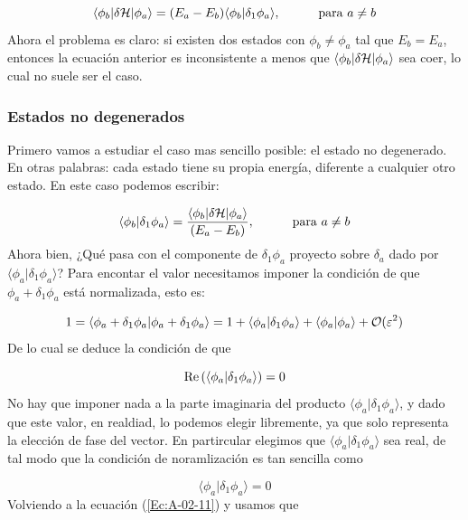 \begin{equation}
    \langle \phi_b |\delta \mathcal{H} |\phi_a \rangle = (E_a - E_b) \langle \phi_b |\delta_1 \phi_a \rangle, \quad \quad \quad \text{para}  \ a \neq b
\end{equation}
Ahora el problema es claro: si existen dos estados con $\phi_b \neq \phi_a$ tal que $E_b = E_a$, entonces la ecuación anterior es inconsistente a menos que $\langle \phi_b | \delta \mathcal{H} |\phi_a\rangle$ sea coer, lo cual no suele ser el caso.

\subsubsection{Estados no degenerados}

Primero vamos a estudiar el caso mas sencillo posible: el estado no degenerado. En otras palabras: cada estado tiene su propia energía, diferente a cualquier otro estado. En este caso podemos escribir:

\begin{equation}
    \langle \phi_b |\delta_1 \phi_a \rangle = \frac{\langle \phi_b |\delta \mathcal{H} |\phi_a \rangle}{(E_a - E_b)}, \quad \quad \quad \text{para}  \ a \neq b \label{Ec:A-02-11}
\end{equation}
Ahora bien, ¿Qué pasa con el componente de $\delta_1 \phi_a$ proyecto sobre $\delta_a$ dado por $\langle \phi_a |\delta_1 \phi_a \rangle$? Para encontar el valor necesitamos imponer la condición de que $\phi_a + \delta_1 \phi_a$ está normalizada, esto es:

\begin{equation}
    1 = \langle \phi_a + \delta_1 \phi_a | \phi_a + \delta_1 \phi_a \rangle = 1+ \langle \phi_a |\delta_1 \phi_a \rangle + \langle \phi_a | \phi_a \rangle + \mathcal{O} (\varepsilon^2)
\end{equation}
De lo cual se deduce la condición de que 

\begin{equation}
     \text{Re} \left( \langle \phi_a |\delta_1 \phi_a \rangle  \right)=0
\end{equation}
No hay que imponer nada a la parte imaginaria del producto $\langle \phi_a | \delta_1 \phi_a \rangle $, y dado que este valor, en realdiad, lo podemos elegir libremente, ya que solo representa la elección de fase del vector. En partircular elegimos que $\langle \phi_a | \delta_1 \phi_a \rangle $ sea real, de tal modo que la condición de noramlización es tan sencilla como

\begin{equation}
    \langle \phi_a |\delta_1 \phi_a \rangle = 0
\end{equation}
Volviendo a la ecuación (\ref{Ec:A-02-11}) y usamos que

